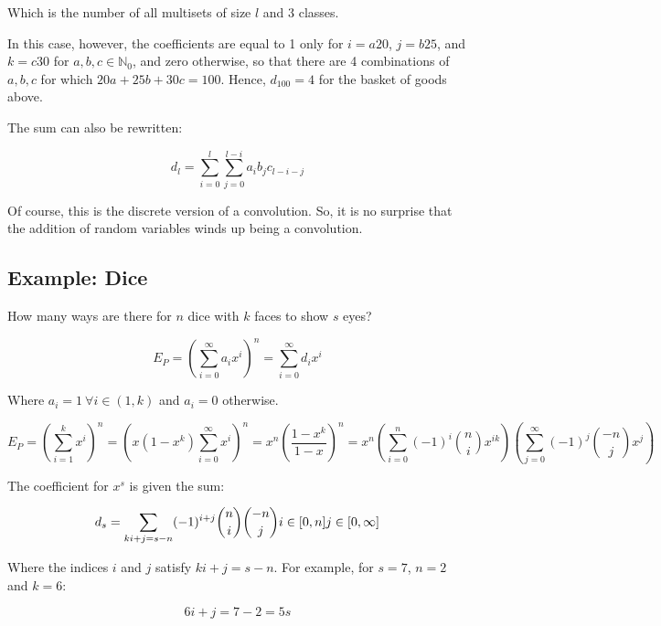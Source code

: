 Which is the number of all multisets of size $l$ and 3 classes. 

In this case, however, the coefficients are equal to 1 only for $i=a20$, $j=b25$, and $k=c30$ for $a,b,c \in \mathbb{N}_0$, and zero otherwise, so that there are 4 combinations of $a,b,c$ for which $20a+25b+30c=100$. Hence, $d_{100} = 4$ for the basket of goods above.

The sum can also be rewritten:

\begin{equation}
d_l = \sum^l_{i=0}\sum^{l-i}_{j=0} a_i b_j c_{l-i-j}
\end{equation}


Of course, this is the discrete version of a convolution. So, it is no surprise that the addition of random variables winds up being a convolution.

\subsection{Example: Dice}

How many ways are there for $n$ dice with $k$ faces to show $s$ eyes?

\begin{equation}
E_P = \left(\sum_{i=0}^\infty a_i x^i\right)^n = \sum_{i=0}^{\infty}d_i x^i
\end{equation}

Where $a_i = 1\ \forall i\in(1,k)$ and $a_i = 0$ otherwise.

\begin{equation}
E_P = \left(\sum_{i=1}^k x^i\right)^n = \left(x(1-x^k)\sum_{i=0}^\infty x^i\right)^n = x^n\left(\frac{1-x^k}{1-x}\right)^n = x^n \left(\sum_{i=0}^n (-1)^i {n \choose i} x^{ik}\right)\left(\sum_{j=0}^{\infty} (-1)^j {-n \choose j} x^j\right)
\end{equation}

The coefficient for $x^s$ is given the sum:

\begin{equation}
d_s = \sum_{ki+j=s-n} (-1)^{i+j}{n \choose i}{-n \choose j}\\
i \in [0,n] \\
j \in [0,\infty]
\end{equation}

Where the indices $i$ and $j$ satisfy $ki+j = s-n$. For example, for $s=7$, $n=2$ and $k=6$:

\begin{equation}
6i+j = 7-2 = 5s
\end{equation}

